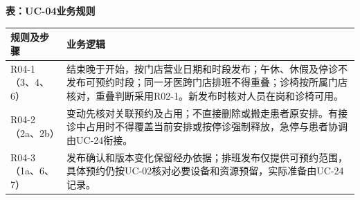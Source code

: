 \documentclass[UTF8,a4paper,zihao=-4,fontset=none]{ctexart}
\begin{document}
\medskip
{\small\setlength{\tabcolsep}{3pt}\renewcommand{\arraystretch}{1.10}
\noindent\textbf{表\thetable：UC-04业务规则}\par\smallskip
\noindent\begin{tabular}{@{}>{\raggedright\arraybackslash}p{3.4cm}>{\raggedright\arraybackslash}p{12.3cm}@{}}
\toprule
规则及步骤 & 业务逻辑 \\ \midrule
R04-1（3、4、6） & 结束晚于开始，按门店营业日期和时段发布；午休、休假及停诊不发布可预约时段；同一牙医跨门店排班不得重叠；诊椅按所属门店核对，重叠判断采用R02-1。新发布时核对人员在岗和诊椅可用。 \\
R04-2（2a、2b） & 变动先核对关联预约及占用；不直接删除或搬走患者原安排。有接诊中占用时不得覆盖当前安排或按停诊强制释放，急停与患者协调由UC-24衔接。 \\
R04-3（1a、6、7） & 发布确认和版本变化保留经办依据；排班发布仅提供可预约范围，具体预约仍按UC-02核对必要设备和资源预留，实际准备由UC-24记录。 \\
\bottomrule
\end{tabular}\par}
\medskip
\endgroup
\clearpage
\end{document}
